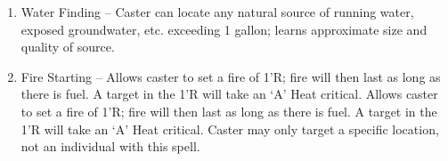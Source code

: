 \documentclass[oneside,12pt]{book}
\begin{document}
\begin{flushleft}
\begin{description}
{\begin{itemize}
\begin{enumerate}
detecting each individual trap in a 5’R area; caster can
concentrate on a 5’R area each round.
\item Water Finding – Caster can locate any natural source of
running water, exposed groundwater, etc. exceeding 1
gallon; learns approximate size and quality of source.
\item Fire Starting – Allows caster to set a fire of 1’R; fire will
then last as long as there is fuel. A target in the 1’R will
take an ‘A’ Heat critical. Allows caster to set a fire of 1’R;
fire will then last as long as there is fuel. A target in the
1’R will take an ‘A’ Heat critical. Caster may only target a
specific location, not an individual with this spell.
\end{enumerate}
\end{itemize}
}
\end{description}
\clearpage

\end{flushleft}
\end{document}
